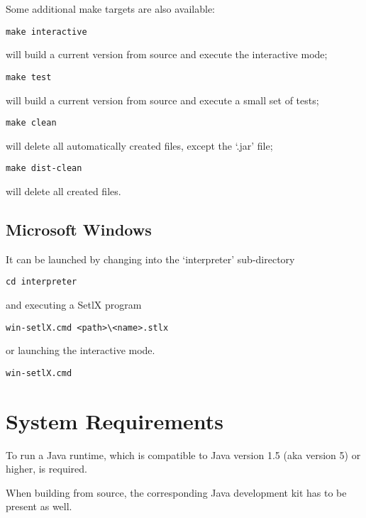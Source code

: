 Some additional make targets are also available:

\begin{lstlisting}
make interactive
\end{lstlisting}

will build a current version from source and execute the interactive mode;

\begin{lstlisting}
make test
\end{lstlisting}

will build a current version from source and execute a small set of tests;

\begin{lstlisting}
make clean
\end{lstlisting}

will delete all automatically created files, except the `.jar' file;

\begin{lstlisting}
make dist-clean
\end{lstlisting}

will delete all created files.

\subsection{Microsoft Windows}

It can be launched by changing into the `interpreter' sub-directory

\begin{lstlisting}
cd interpreter
\end{lstlisting}

and executing a SetlX program

\begin{lstlisting}
win-setlX.cmd <path>\<name>.stlx
\end{lstlisting}

or launching the interactive mode.

\begin{lstlisting}
win-setlX.cmd
\end{lstlisting}

\section{System Requirements}

To run \setlX{} a Java runtime, which is compatible to Java version 1.5 (aka version 5) or higher, is required.

When building from source, the corresponding Java development kit has to be present as well.

